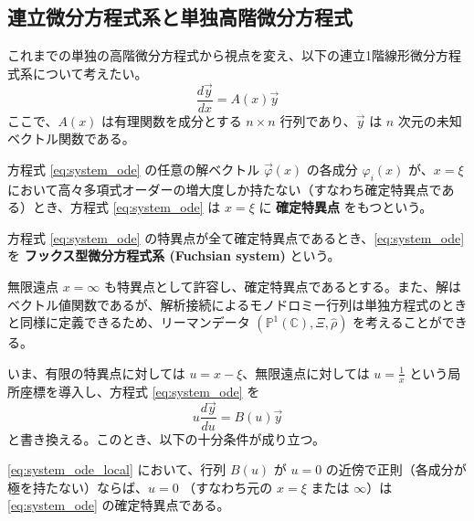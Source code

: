 \subsection{連立微分方程式系と単独高階微分方程式}

これまでの単独の高階微分方程式から視点を変え、以下の連立1階線形微分方程式系について考えたい。
\begin{equation}\label{eq:system_ode}
    \frac{d\vec{y}}{dx} = A(x)\vec{y}
\end{equation}
ここで、$A(x)$ は有理関数を成分とする $n \times n$ 行列であり、$\vec{y}$ は $n$ 次元の未知ベクトル関数である。

\begin{definition}
    方程式 \eqref{eq:system_ode} の任意の解ベクトル $\vec{\varphi}(x)$ の各成分 $\varphi_{i}(x)$ が、$x=\xi$ において高々多項式オーダーの増大度しか持たない（すなわち確定特異点である）とき、方程式 \eqref{eq:system_ode} は $x=\xi$ に \textbf{確定特異点} をもつという。
\end{definition}

\begin{definition}
    方程式 \eqref{eq:system_ode} の特異点が全て確定特異点であるとき、\eqref{eq:system_ode} を \textbf{フックス型微分方程式系 (Fuchsian system)} という。
\end{definition}

無限遠点 $x=\infty$ も特異点として許容し、確定特異点であるとする。また、解はベクトル値関数であるが、解析接続によるモノドロミー行列は単独方程式のときと同様に定義できるため、リーマンデータ $(\mathbb{P}^{1}(\mathbb{C}), \Xi, \hat{\rho})$ を考えることができる。

いま、有限の特異点に対しては $u=x-\xi$、無限遠点に対しては $u=\frac{1}{x}$ という局所座標を導入し、方程式 \eqref{eq:system_ode} を
\begin{equation}\label{eq:system_ode_local}
    u\frac{d\vec{y}}{du} = B(u)\vec{y}
\end{equation}
と書き換える。このとき、以下の十分条件が成り立つ。

\begin{proposition}\label{prop:fuchs_condition_system}
    \eqref{eq:system_ode_local} において、行列 $B(u)$ が $u=0$ の近傍で正則（各成分が極を持たない）ならば、$u=0$ （すなわち元の $x=\xi$ または $\infty$）は \eqref{eq:system_ode} の確定特異点である。
\end{proposition}

